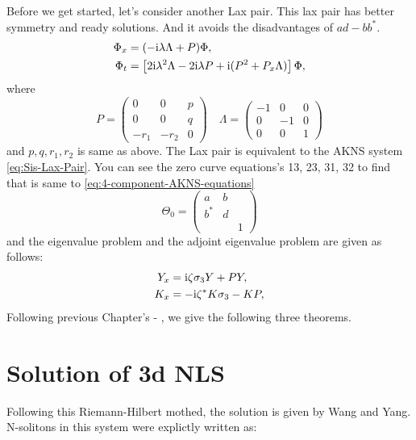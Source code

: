 Before we get started, let's consider another Lax pair. This lax pair has better symmetry and ready solutions. And it avoids the disadvantages of $ ad-bb^* $.
\begin{align}
    \Phi_{x} &= (- \mathrm{i} \lambda \Lambda + P) \Phi, \\
    \Phi_{t} &= \left[2 \mathrm{i} \lambda^{2} \Lambda - 2 \mathrm{i} \lambda P + \mathrm{i}(P^{2} + P_{x}\Lambda) \right]\Phi,
\end{align}
where 
\begin{equation}
    P=\begin{pmatrix}
        0 & 0 & p \\ 0 & 0 & q \\ -r_{1} & -r_{2} & 0
    \end{pmatrix} \quad
    \Lambda = \begin{pmatrix}
        -1 & 0 & 0 \\ 0 & -1 & 0 \\ 0 & 0 & 1 
    \end{pmatrix}
\end{equation}
and $ p, q, r_{1}, r_{2} $ is same as above. The Lax pair is equivalent to the AKNS system \eqref{eq:Sis-Lax-Pair}. You can see the zero curve equations's 13, 23, 31, 32 to find that is same to \eqref{eq:4-component-AKNS-equations}
\begin{equation}
    \Theta_{0} = \begin{pmatrix}
        a & b & \\ b^{*} & d &  \\ &  & 1 
    \end{pmatrix}
\end{equation} 
and the eigenvalue problem and the adjoint eigenvalue problem are given as follows:
\begin{subequations}
    \begin{align}
        Y_{x} &= \mathrm{i} \zeta \sigma_{3} Y + PY, \label{eq:AKNS-x-Lax} \\
        K_{x} &= -\mathrm{i} \zeta^{*}K \sigma_{3} - K P \label{eq:AKNS-x-adjoint-Lax}, 
    \end{align}
\end{subequations}
Following previous Chapter's  - , we give the following three theorems. 

\section{Solution of 3d NLS}
Following this Riemann-Hilbert mothed, the solution is given by Wang and Yang\cite{Wang2010JMP}. N-solitons in this system were explictly written as:

